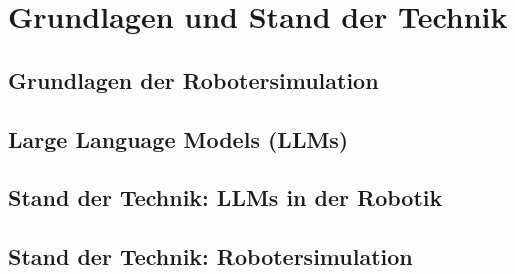 \chapter{Grundlagen und Stand der Technik}
\label{cap:Grundlagen}

\section{Grundlagen der Robotersimulation}
\label{sec:Grundlagen_Robotersimulation}

\section{Large Language Models (LLMs)}
\label{sec:Grundlagen_LLMs}

\section{Stand der Technik: LLMs in der Robotik}
\label{sec:Stand_LLMs_Robotik}

\section{Stand der Technik: Robotersimulation}
\label{sec:Stand_Robotersimulation}
